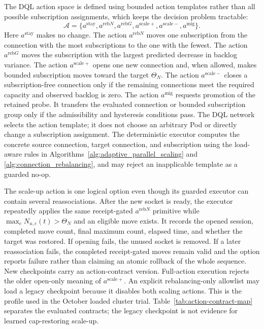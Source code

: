 \documentclass[manuscript,nonacm]{acmart}
\begin{document}
The DQL action space is defined using bounded action templates rather than all
possible subscription assignments, which keeps the decision problem tractable:
\begin{equation}
	\mathcal{A}=
	\{a^{\mathrm{stay}},a^{\mathrm{reb}N},a^{\mathrm{reb}G},a^{\mathrm{scale}+},a^{\mathrm{scale}-},a^{\mathrm{mig}}\}.
	\label{eq:dql_actions}
\end{equation}
Here $a^{\mathrm{stay}}$ makes no change. The action $a^{\mathrm{reb}N}$ moves one subscription
from the connection with the most subscriptions to the one with the fewest.
The action $a^{\mathrm{reb}G}$ moves the subscription with the largest predicted decrease
in backlog variance. The action $a^{\mathrm{scale}+}$ opens one new connection and,
when allowed, makes bounded subscription moves toward the target $\Theta_N$.
The action $a^{\mathrm{scale}-}$ closes a subscription-free connection only if the
remaining connections meet the required capacity and observed backlog is zero.
The action $a^{\mathrm{mig}}$ requests promotion of the retained probe. It transfers the
evaluated connection or bounded subscription group only if the admissibility
and hysteresis conditions pass. The DQL network selects
the action template; it does not choose an arbitrary Pod or directly change a
subscription assignment. The deterministic executor computes the concrete
source connection, target connection, and subscription using the load-aware
rules in Algorithms~\ref{alg:adaptive_parallel_scaling} and
\ref{alg:connection_rebalancing}, and may reject an inapplicable template as a
guarded no-op.

The scale-up action is one logical option even though its guarded executor can
contain several reassociations. After the new socket is ready, the executor
repeatedly applies the same receipt-gated $a^{\mathrm{reb}N}$ primitive while
$\max_c N_{u,c}(t)>\Theta_N$ and an eligible move exists. It records the opened
session, completed move count, final maximum count, elapsed time, and whether
the target was restored. If opening fails, the unused socket is removed. If a
later reassociation fails, the completed receipt-gated moves remain valid and
the option reports failure rather than claiming an atomic rollback of the
whole sequence. New checkpoints carry an action-contract version.
Full-action execution rejects the older open-only meaning of
$a^{\mathrm{scale}+}$. An explicit rebalancing-only allowlist may load a legacy
checkpoint because it disables both scaling actions. This is the profile used
in the October loaded cluster trial. Table~\ref{tab:action-contract-map}
separates the evaluated contracts; the legacy checkpoint is not evidence for
learned cap-restoring scale-up.
\end{document}
